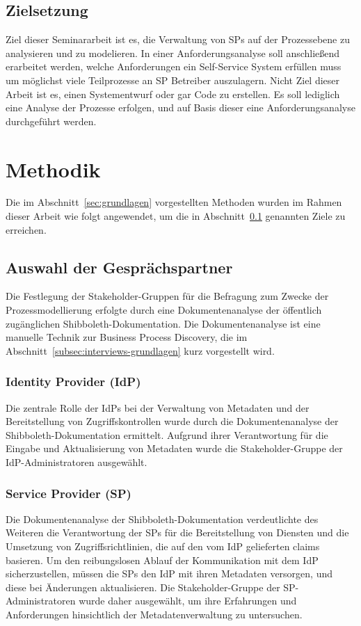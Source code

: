 \documentclass[a4paper, fontsize=11pt]{scrartcl}
\begin{document}
\subsection{Zielsetzung}\label{subsec:zielsetzung}
Ziel dieser Seminararbeit ist es, die Verwaltung von SPs auf der Prozessebene zu analysieren und zu modelieren.
In einer Anforderungsanalyse soll anschließend erarbeitet werden, welche Anforderungen ein Self-Service System erfüllen muss um möglichst viele Teilprozesse an SP Betreiber auszulagern.
Nicht Ziel dieser Arbeit ist es, einen Systementwurf oder gar Code zu erstellen.
Es soll lediglich eine Analyse der Prozesse erfolgen, und auf Basis dieser eine Anforderungsanalyse durchgeführt werden.




\section{Methodik}\label{sec:methodik}
Die im Abschnitt~\ref{sec:grundlagen} vorgestellten Methoden wurden im Rahmen dieser Arbeit wie folgt angewendet, um die in Abschnitt~\ref{subsec:zielsetzung} genannten Ziele zu erreichen.
\subsection{Auswahl der Gesprächspartner}\label{subsubsec:auswahl-gespraechspartner}
Die Festlegung der Stakeholder-Gruppen für die Befragung zum Zwecke der Prozessmodellierung erfolgte durch eine Dokumentenanalyse der öffentlich zugänglichen Shibboleth-Dokumentation. 
Die Dokumentenanalyse ist eine manuelle Technik zur Business Process Discovery, die im Abschnitt~\ref{subsec:interviews-grundlagen} kurz vorgestellt wird. 

\subsubsection{Identity Provider (IdP)}
Die zentrale Rolle der IdPs bei der Verwaltung von Metadaten und der Bereitstellung von Zugriffskontrollen wurde durch die Dokumentenanalyse der Shibboleth-Dokumentation ermittelt. 
Aufgrund ihrer Verantwortung für die Eingabe und Aktualisierung von Metadaten wurde die Stakeholder-Gruppe der IdP-Administratoren ausgewählt.

\subsubsection{Service Provider (SP)}
Die Dokumentenanalyse der Shibboleth-Dokumentation verdeutlichte des Weiteren die Verantwortung der SPs für die Bereitstellung von Diensten und die Umsetzung von Zugriffsrichtlinien, die auf den vom IdP gelieferten claims basieren.
Um den reibungslosen Ablauf der Kommunikation mit dem IdP sicherzustellen, müssen die SPs den IdP mit ihren Metadaten versorgen, und diese bei Änderungen aktualisieren.
Die Stakeholder-Gruppe der SP-Administratoren wurde daher ausgewählt, um ihre Erfahrungen und Anforderungen hinsichtlich der Metadatenverwaltung zu untersuchen.
\end{document}
